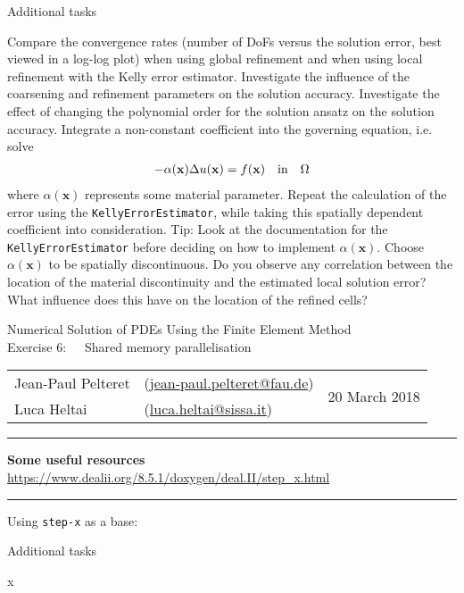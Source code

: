 \documentclass[11pt,answers]{exam}
\makeatletter
\newcommand{\makeheader}[3]{%
\setcounter{question}{0}
\begin{center}
{\sc Numerical Solution of PDEs Using the Finite Element Method}\vspace{2ex}\\
{\sc Exercise #1:\ \ \ #2}\vspace{2ex}\\
\begin{tabular*}{\textwidth}{ll @{\extracolsep{\fill}}r}
Jean-Paul Pelteret & (\url{jean-paul.pelteret@fau.de}) & \multirow{2}{*}{#3} \\
Luca Heltai & (\url{luca.heltai@sissa.it}) & \\
\end{tabular*}
\end{center}
}
\newcommand{\makeresources}[1]{%
\rule{\textwidth}{0.6mm}
\textbf{Some useful resources}\\[1.5ex]
#1 \par
\rule{\textwidth}{0.6mm}
}
\makeatother
\begin{document}
\begin{questions}
\question Additional tasks
\begin{parts}
\bonuspart Compare the convergence rates (number of DoFs versus the solution error, best viewed in a log-log plot) when using global refinement and when using local refinement with the Kelly error estimator.
\bonuspart Investigate the influence of the coarsening and refinement parameters on the solution accuracy.
\bonuspart Investigate the effect of changing the polynomial order for the solution ansatz on the solution accuracy.
\bonuspart Integrate a non-constant coefficient into the governing equation, i.e. solve
\begin{gather*}
-\alpha(\mathbf{x}) \Delta u(\mathbf{x}) = f(\mathbf{x}) \quad \textnormal{in} \quad \Omega
\end{gather*}
where $\alpha(\mathbf{x})$ represents some material parameter.
Repeat the calculation of the error using the \verb|KellyErrorEstimator|, while taking this spatially dependent coefficient into consideration. 
Tip: Look at the documentation for the \verb|KellyErrorEstimator| before deciding on how to implement $\alpha(\mathbf{x})$.
\bonuspart Choose $\alpha(\mathbf{x})$ to be spatially discontinuous.
Do you observe any correlation between the location of the material discontinuity and the estimated local solution error?
What influence does this have on the location of the refined cells?
\end{parts}

\end{questions}




\clearpage
\makeheader{6}{Shared memory parallelisation}{20 March 2018}
\makeresources{%
\url{https://www.dealii.org/8.5.1/doxygen/deal.II/step_x.html}
}

\begin{questions}

\question Using \verb|step-x| as a base:


\question Additional tasks
\begin{parts}
\bonuspart x
\end{parts}

\end{questions}
\end{document}
